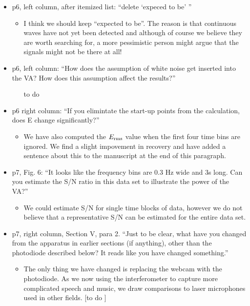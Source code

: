 \documentclass[a4paper, 10pt]{letter}
\begin{document}
\begin{itemize}
\item p6, left column, after itemized list: ``delete `expeced to be' ''
\begin{itemize}
\item I think we should keep ``expected to be''. The reason is that continuous waves have not yet been detected and although of course we believe they are worth searching for, a more pessimistic person might argue that the signals might not be there at all! 
\end{itemize}

\item p6, left column: ``How does the assumption of white noise get inserted into the VA? How does this assumption affect the results?'' 
\begin{itemize}
\item [to do]
\end{itemize}

\item p6 right column: ``If you elimintate the start-up points from the calculation, does E change significantly?''
\begin{itemize}
\item We have also computed the $E_{\rm rms}$ value when the first four time bins are ignored. We find a slight impovement in recovery and have added a sentence about this to the manuscript at the end of this paragraph. 
\end{itemize}

\item p7, Fig. 6: ``It looks like the frequency bins are 0.3 Hz wide and 3s long. Can you estimate the S/N ratio in this data set to illustrate the power of the VA?''
\begin{itemize}
\item We could estimate S/N for single time blocks of data, however we do not believe that a representative S/N can be estimated for the entire data set. 
\end{itemize}

\item p7, right column, Section V, para 2. ``Just to be clear, what have you changed from the apparatus in earlier sections (if anything), other than the photodiode described below? It reads like you have changed something.''
\begin{itemize}
\item The only thing we have changed is replacing the webcam with the photodiode. As we now using the interferometer to capture more complicated speech and music, we draw comparisons to laser microphones used in other fields.  [to do ]
\end{itemize}


\end{itemize}
\end{document}
